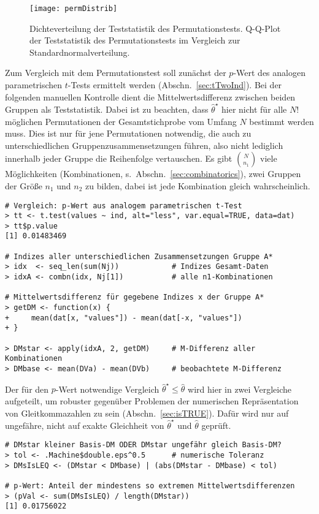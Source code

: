 \begin{figure}[ht]
\centering
\texttt{[image: permDistrib]}
\vspace*{-1em}
\caption{Dichteverteilung der Teststatistik des Permutationstests. Q-Q-Plot der Teststatistik des Permutationstests im Vergleich zur Standardnormalverteilung.}
\label{fig:permDistrib}
\end{figure}

Zum Vergleich mit dem Permutationstest soll zunächst der $p$-Wert des analogen parametrischen $t$-Tests ermittelt werden (Abschn.\ \ref{sec:tTwoInd}). Bei der folgenden manuellen Kontrolle dient die Mittelwertsdifferenz zwischen beiden Gruppen als Teststatistik. Dabei ist zu beachten, dass $\hat{\theta}^{\star}$ hier nicht für alle $N!$ möglichen Permutationen der Gesamtstichprobe vom Umfang $N$ bestimmt werden muss. Dies ist nur für jene Permutationen notwendig, die auch zu unterschiedlichen Gruppenzusammensetzungen führen, also nicht lediglich innerhalb jeder Gruppe die Reihenfolge vertauschen. Es gibt $N \choose n_{1}$ viele Möglichkeiten (Kombinationen, s.\ Abschn.\ \ref{sec:combinatorics}), zwei Gruppen der Größe $n_{1}$ und $n_{2}$ zu bilden, dabei ist jede Kombination gleich wahrscheinlich.
\begin{lstlisting}
# Vergleich: p-Wert aus analogem parametrischen t-Test
> tt <- t.test(values ~ ind, alt="less", var.equal=TRUE, data=dat)
> tt$p.value
[1] 0.01483469

# Indizes aller unterschiedlichen Zusammensetzungen Gruppe A*
> idx  <- seq_len(sum(Nj))            # Indizes Gesamt-Daten
> idxA <- combn(idx, Nj[1])           # alle n1-Kombinationen

# Mittelwertsdifferenz für gegebene Indizes x der Gruppe A*
> getDM <- function(x) {
+     mean(dat[x, "values"]) - mean(dat[-x, "values"])
+ }

> DMstar <- apply(idxA, 2, getDM)     # M-Differenz aller Kombinationen
> DMbase <- mean(DVa) - mean(DVb)     # beobachtete M-Differenz
\end{lstlisting}

Der für den $p$-Wert notwendige Vergleich $\hat{\theta}^{\star} \leq \hat{\theta}$ wird hier in zwei Vergleiche aufgeteilt, um robuster gegenüber Problemen der numerischen Repräsentation von Gleitkommazahlen zu sein (Abschn.\ \ref{sec:isTRUE}). Dafür wird nur auf ungefähre, nicht auf exakte Gleichheit von $\hat{\theta}^{\star}$ und $\hat{\theta}$ geprüft.
\begin{lstlisting}
# DMstar kleiner Basis-DM ODER DMstar ungefähr gleich Basis-DM?
> tol <- .Machine$double.eps^0.5      # numerische Toleranz
> DMsIsLEQ <- (DMstar < DMbase) | (abs(DMstar - DMbase) < tol)

# p-Wert: Anteil der mindestens so extremen Mittelwertsdifferenzen
> (pVal <- sum(DMsIsLEQ) / length(DMstar))
[1] 0.01756022
\end{lstlisting}

